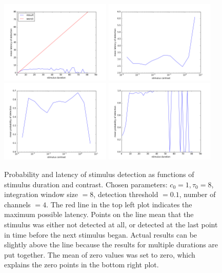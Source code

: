 \documentclass{scrartcl}
\begin{document}
\begin{figure}[h]
\centering
\includegraphics[width=0.47\textwidth, clip]{../pics/t4/latency_of_dur_4chans_1_8_8_01}
\includegraphics[width=0.47\textwidth, clip]{../pics/t4/latency_of_contr_4chans_1_8_8_01}\\
\includegraphics[width=0.47\textwidth, clip]{../pics/t4/prob_of_con_4chans_1_8_8_01}
\includegraphics[width=0.47\textwidth, clip]{../pics/t4/prob_of_dur_4chans_1_8_8_01}\\
\caption{Probability and latency of stimulus detection as functions of stimulus duration and contrast. Chosen parameters: $c_0 = 1, \tau_0 = 8$, integration window size $=8$, detection threshold $=0.1$, number of channels $=4$. The red line in the top left plot indicates the maximum possible latency. Points on the line mean that the stimulus was either not detected at all, or detected at the last point in time before the next stimulus began. Actual results can be slightly above the line because the results for multiple durations are put together. The mean of zero values was set to zero, which explains the zero points in the bottom right plot.}
\label{funs}
\end{figure}
\end{document}
